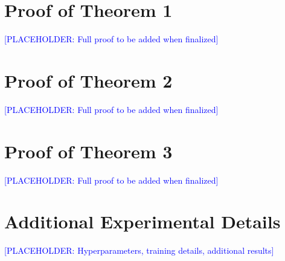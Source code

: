 \documentclass{article}
\newcommand{\placeholder}[1]{\textcolor{blue}{[PLACEHOLDER: #1]}}
\begin{document}
\appendix

\section{Proof of Theorem 1}
\label{app:thm1}
\placeholder{Full proof to be added when finalized}

\section{Proof of Theorem 2}
\label{app:thm2}
\placeholder{Full proof to be added when finalized}

\section{Proof of Theorem 3}
\label{app:thm3}
\placeholder{Full proof to be added when finalized}

\section{Additional Experimental Details}
\label{app:experiments}
\placeholder{Hyperparameters, training details, additional results}
\end{document}
